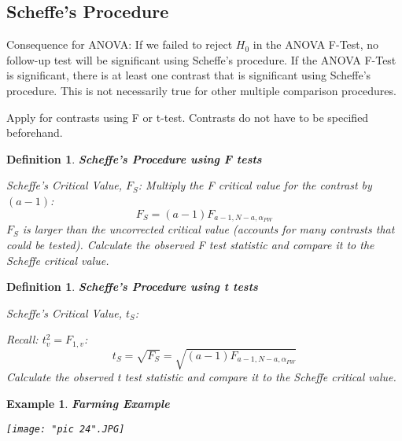 \documentclass[a4paper,11pt]{article}
\newtheorem{defn}[thm]{Definition}
\newtheorem{eg}[thm]{Example}
\begin{document}
\subsection{Scheffe's Procedure}
Consequence for ANOVA: If we failed to reject $H_0$ in the ANOVA F-Test, no follow-up test will be significant using Scheffe's procedure. If the ANOVA F-Test is significant, there is at least one contrast that is significant using Scheffe's procedure. This is not necessarily true for other multiple comparison procedures. 

Apply for contrasts using F or t-test. Contrasts do not have to be specified beforehand. 
\begin{defn}
\normalfont
\textbf{Scheffe's Procedure using F tests}

Scheffe's Critical Value, $F_S$: 
Multiply the F critical value for the contrast by $(a-1)$: 
$$F_S=(a-1)F_{a-1,N-a,\alpha_{FW}}$$
$F_S$ is larger than the uncorrected critical value (accounts for many contrasts that could be tested). Calculate the observed F test statistic and compare it to the Scheffe critical value. 
\end{defn}
\begin{defn}
\normalfont
\textbf{Scheffe's Procedure using t tests}

Scheffe's Critical Value, $t_S$:

Recall: $t_v^2=F_{1,v}$:
$$t_S=\sqrt{F_S}=\sqrt{(a-1)F_{a-1, N-a, \alpha_{FW}}}$$
Calculate the observed t test statistic and compare it to the Scheffe critical value. 
\end{defn}
\newpage
\begin{eg}
\normalfont
\textbf{Farming Example}

\begin{center}
	\texttt{[image: "pic 24".JPG]}
\end{center}
\end{eg}
\end{document}
